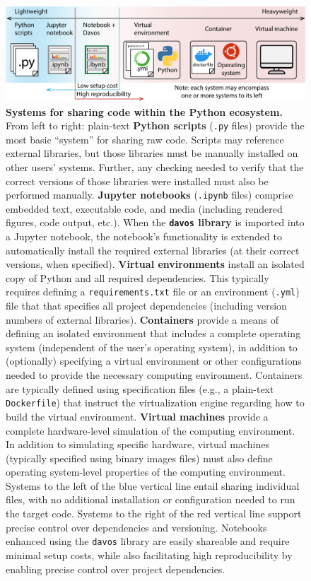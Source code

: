 \documentclass[preprint,12pt,a4paper]{elsarticle}
\begin{document}
\begin{figure}[tp]
\centering
\includegraphics[width=\textwidth]{figs/shareable_code}
\caption{\small \textbf{Systems for sharing code within the Python
    ecosystem.}  From left to right: plain-text \textbf{Python
    scripts} (\texttt{.py} files) provide the most basic ``system''
  for sharing raw code.  Scripts may reference external libraries, but
  those libraries must be manually installed on other users' systems.
  Further, any checking needed to verify that the correct versions of
  those libraries were installed must also be performed manually.
  \textbf{Jupyter notebooks} (\texttt{.ipynb} files) comprise embedded
  text, executable code, and media (including rendered figures, code
  output, etc.).  When the \textbf{\texttt{davos} library} is imported
  into a Jupyter notebook, the notebook's functionality is extended to
  automatically install the required external libraries (at their
  correct versions, when specified).  \textbf{Virtual environments}
  install an isolated copy of Python and all required dependencies.
  This typically requires defining a \texttt{requirements.txt} file or
  an environment (\texttt{.yml}) file that that specifies all project
  dependencies (including version numbers of external libraries).
  \textbf{Containers} provide a means of defining an isolated
  environment that includes a complete operating system (independent
  of the user's operating system), in addition to (optionally)
  specifying a virtual environment or other configurations needed to
  provide the necessary computing environment.  Containers are
  typically defined using specification files (e.g., a plain-text
  \texttt{Dockerfile}) that instruct the virtualization engine
  regarding how to build the virtual environment.  \textbf{Virtual
    machines} provide a complete hardware-level simulation of the
  computing environment.  In addition to simulating specific hardware,
  virtual machines (typically specified using binary images files)
  must also define operating system-level properties of the computing
  environment.  Systems to the left of the blue vertical line entail
  sharing individual files, with no additional installation or
  configuration needed to run the target code.  Systems to the right
  of the red vertical line support precise control over dependencies
  and versioning.  Notebooks enhanced using the \texttt{davos} library
  are easily shareable and require minimal setup costs, while also
  facilitating high reproducibility by enabling precise control over
  project dependencies.}
\label{fig:code-sharing}
\end{figure}
\end{document}
